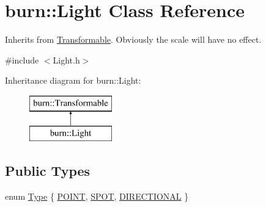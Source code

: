 \hypertarget{classburn_1_1_light}{\section{burn\-:\-:Light Class Reference}
\label{classburn_1_1_light}
}


Inherits from \hyperlink{classburn_1_1_transformable}{Transformable}. Obviously the scale will have no effect.  




{\ttfamily \#include $<$Light.\-h$>$}

Inheritance diagram for burn\-:\-:Light\-:\begin{figure}[H]
\begin{center}
\leavevmode
\includegraphics[height=2.000000cm]{classburn_1_1_light}
\end{center}
\end{figure}
\subsection*{Public Types}
\begin{DoxyCompactItemize}
\item 
enum \hyperlink{classburn_1_1_light_a8fa12cb3ae2a0eebbfbf5c59c2b4b599}{Type} \{ \hyperlink{classburn_1_1_light_a8fa12cb3ae2a0eebbfbf5c59c2b4b599a9e95c3ab6dc0c16260ba514a02151ce7}{P\-O\-I\-N\-T}, 
\hyperlink{classburn_1_1_light_a8fa12cb3ae2a0eebbfbf5c59c2b4b599a69cd23e3f1a59a02503370432fe42fd6}{S\-P\-O\-T}, 
\hyperlink{classburn_1_1_light_a8fa12cb3ae2a0eebbfbf5c59c2b4b599a25edb9fd19c152a1fbae29ec6a95b032}{D\-I\-R\-E\-C\-T\-I\-O\-N\-A\-L}
 \}
\end{DoxyCompactItemize}
